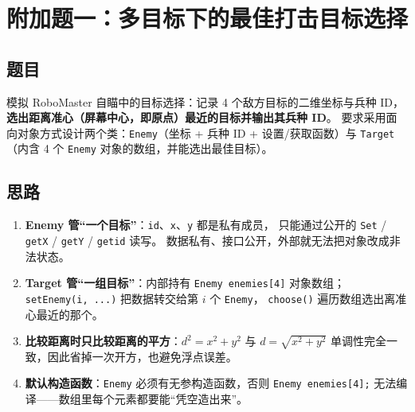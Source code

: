 %
%

\section{附加题一：多目标下的最佳打击目标选择}
\label{sec:visual}

\subsection{题目}
模拟 RoboMaster 自瞄中的目标选择：记录 4 个敌方目标的二维坐标与兵种 ID，
\textbf{选出距离准心（屏幕中心，即原点）最近的目标并输出其兵种 ID}。
要求采用面向对象方式设计两个类：\texttt{Enemy}（坐标 + 兵种 ID + 设置/获取函数）与
\texttt{Target}（内含 4 个 \texttt{Enemy} 对象的数组，并能选出最佳目标）。

\subsection{思路}
\begin{enumerate}
  \item \textbf{Enemy 管“一个目标”}：\texttt{id}、\texttt{x}、\texttt{y} 都是私有成员，
        只能通过公开的 \texttt{Set} / \texttt{getX} / \texttt{getY} / \texttt{getid} 读写。
        数据私有、接口公开，外部就无法把对象改成非法状态。
  \item \textbf{Target 管“一组目标”}：内部持有 \texttt{Enemy enemies[4]} 对象数组；
        \texttt{setEnemy(i, ...)} 把数据转交给第 $i$ 个 \texttt{Enemy}，
        \texttt{choose()} 遍历数组选出离准心最近的那个。
  \item \textbf{比较距离时只比较距离的平方}：$d^2 = x^2 + y^2$ 与 $d = \sqrt{x^2+y^2}$
        单调性完全一致，因此省掉一次开方，也避免浮点误差。
  \item \textbf{默认构造函数}：\texttt{Enemy} 必须有无参构造函数，否则
        \texttt{Enemy enemies[4];} 无法编译——数组里每个元素都要能“凭空造出来”。
\end{enumerate}

